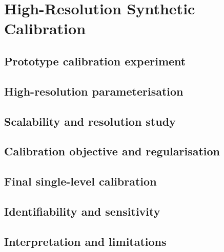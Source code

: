 \chapter{High-Resolution Synthetic Calibration}
\label{ch:calibration}

\section{Prototype calibration experiment}
\label{sec:cal-prototype}

\section{High-resolution parameterisation}
\label{sec:cal-resolution}

\section{Scalability and resolution study}
\label{sec:cal-scaling}

\section{Calibration objective and regularisation}
\label{sec:cal-objective}

\section{Final single-level calibration}
\label{sec:cal-results}

\section{Identifiability and sensitivity}
\label{sec:cal-identifiability}

\section{Interpretation and limitations}
\label{sec:cal-interpretation}
